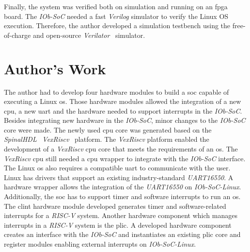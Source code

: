 Finally, the system was verified both on simulation and running on an \acrshort{fpga} board. The \textit{IOb-SoC} needed a fast \textit{Verilog} simulator to verify the Linux OS execution. Therefore, the author developed a simulation testbench using the free-of-charge and open-source \textit{Verilator}~\cite{snyder2010verilator} simulator.

\section{Author's Work}
\label{section:authors_work}
The author had to develop four hardware modules to build a \acrfull{soc} capable of executing a Linux \acrshort{os}. Those hardware modules allowed the integration of a new \acrshort{cpu}, a new \acrshort{uart} and the hardware needed to support interrupts in the \textit{IOb-SoC}. Besides integrating new hardware in the \textit{IOb-SoC}, minor changes to the \textit{IOb-SoC} core were made. The newly used \acrshort{cpu} core was generated based on the \textit{SpinalHDL}~\cite{papon2017spinalhdl} \textit{VexRiscv}~\cite{vexriscv} platform. The \textit{VexRiscv} platform enabled the development of a \textit{VexRiscv} \acrshort{cpu} core that meets the requirements of an \acrshort{os}. The \textit{VexRiscv} \acrshort{cpu} still needed a \acrshort{cpu} wrapper to integrate with the \textit{IOb-SoC} interface. The Linux \acrshort{os} also requires a compatible \acrshort{uart} to communicate with the user. Linux has drivers that support an existing industry-standard \textit{UART16550}. A hardware wrapper allows the integration of the \textit{UART16550} on \textit{IOb-SoC-Linux}. Additionally, the \acrshort{soc} has to support timer and software interrupts to run an \acrshort{os}. The \acrshort{clint} hardware module developed generates timer and software-related interrupts for a \textit{RISC-V} system. Another hardware component which manages interrupts in a \textit{RISC-V} system is the \acrshort{plic}. A developed hardware component creates an interface with the \textit{IOb-SoC} and instantiates an existing \acrshort{plic} core and register modules enabling external interrupts on \textit{IOb-SoC-Linux}.

